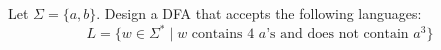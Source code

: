 Let $\Sigma = \{a, b\}$.
Design a DFA that accepts the following languages:
\[
L = \{w \in \Sigma^* \mid w \text{ contains 4 $a$'s and does not contain $a^3$}\}
\]
